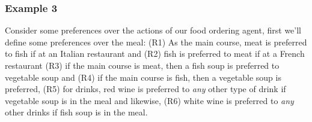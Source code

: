 \documentclass[sigconf,anonymous]{aamas}
\newtheorem{definition}{Definition}
\begin{document}







\subsubsection{Example 3}
Consider some preferences over the actions of our food ordering agent, first we'll define some preferences over the meal: (R1) As the main course, meat is preferred to fish if at an Italian restaurant and (R2) fish is preferred to meat if at a French restaurant (R3) if the main course is meat, then a fish soup is preferred to vegetable soup and (R4) if the main course is fish, then a vegetable soup is preferred, (R5) for drinks, red wine is preferred to \textit{any} other type of drink if vegetable soup is in the meal and likewise, (R6) white wine is preferred to \textit{any} other drinks if fish soup is in the meal. 
\end{document}
